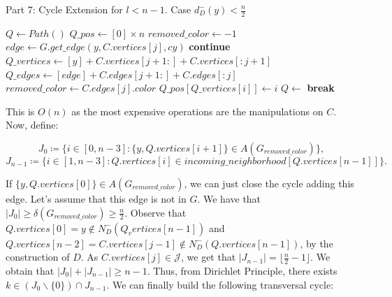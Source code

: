 \begin{algorithm}[H]
    \caption{Part 7: Cycle Extension for \( l < n - 1 \). Case \( d^-_D(y) < \frac{n}{2} \)}
    \begin{algorithmic}[1]
            \State $Q \gets Path()$
            \State $Q\_pos \gets [0] \times n$
            \State $removed\_color \gets -1$
                \State $edge \gets G.get\_edge(y, C.vertices[j], cy)$
                    \State \textbf{continue}
                \EndIf
                \State $Q\_vertices \gets [y] + C.vertices[j + 1:] + C.vertices[:j + 1]$
                \State $Q\_edges \gets [edge] + C.edges[j + 1:] + C.edges[:j]$
                \State $removed\_color \gets C.edges[j].color$
                    \State $Q\_pos[Q\_vertices[i]] \gets i$
                \EndFor
                \State $Q \gets$ 
                \State \textbf{break}
            \EndFor
        \EndFunction
    \end{algorithmic}
\end{algorithm}

This is $O(n)$ as the most expensive operations are the manipulations on $C$.
Now, define:

\begin{equation}
    J_0 \coloneqq \{i \in [0, n - 3]: \{y, Q.vertices[i+1]\} \in A(G_{removed\_color})\},
\end{equation}
\begin{equation}
    J_{n-1} \coloneqq \{i \in [1, n - 3] : Q.vertices[i] \in incoming\_neighborhood[Q.vertices[n-1]]\}.
\end{equation}

If $\{y, Q.vertices[0]\} \in A(G_{removed\_color})$, we can just close the cycle adding this edge.
Let's assume that this edge is not in $G$. We have that $|J_0| \geq \delta(G_{removed\_color}) \geq \frac{n}{2}$.
Observe that $Q.vertices[0] = y \notin N^-_D(Q_vertices[n - 1])$ and $Q.vertices[n - 2] = C.vertices[j - 1] \notin N^-_D(Q.vertices[n - 1])$,
by the construction of $D$. As $C.vertices[j] \in \mathcal{J}$, we get that
$|J_{n-1}| = \lfloor \frac{n}{2} - 1 \rfloor$. We obtain that $|J_0| + |J_{n-1}| \geq n - 1$.
Thus, from Dirichlet Principle, there exists $k \in (J_0 \backslash \{0\}) \cap J_{n-1}$. 
We can finally build the following transversal cycle:

